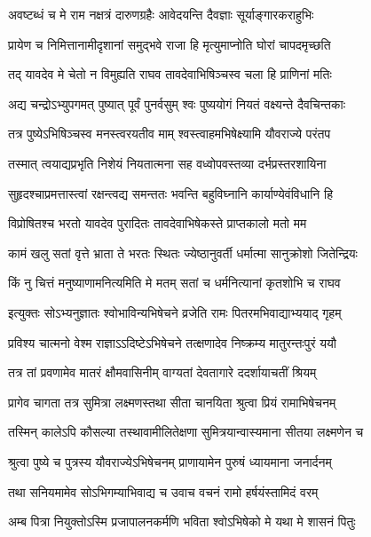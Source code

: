 \twolineshloka
{अवष्टब्धं च मे राम नक्षत्रं दारुणग्रहैः}
{आवेदयन्ति दैवज्ञाः सूर्याङ्गारकराहुभिः} %

\twolineshloka
{प्रायेण च निमित्तानामीदृशानां समुद्भवे}
{राजा हि मृत्युमाप्नोति घोरां चापदमृच्छति} %

\twolineshloka
{तद् यावदेव मे चेतो न विमुह्यति राघव}
{तावदेवाभिषिञ्चस्व चला हि प्राणिनां मतिः} %

\twolineshloka
{अद्य चन्द्रोऽभ्युपगमत् पुष्यात् पूर्वं पुनर्वसुम्}
{श्वः पुष्ययोगं नियतं वक्ष्यन्ते दैवचिन्तकाः} %

\twolineshloka
{तत्र पुष्येऽभिषिञ्चस्व मनस्त्वरयतीव माम्}
{श्वस्त्वाहमभिषेक्ष्यामि यौवराज्ये परंतप} %

\twolineshloka
{तस्मात् त्वयाद्यप्रभृति निशेयं नियतात्मना}
{सह वध्वोपवस्तव्या दर्भप्रस्तरशायिना} %

\twolineshloka
{सुहृदश्चाप्रमत्तास्त्वां रक्षन्त्वद्य समन्ततः}
{भवन्ति बहुविघ्नानि कार्याण्येवंविधानि हि} %

\twolineshloka
{विप्रोषितश्च भरतो यावदेव पुरादितः}
{तावदेवाभिषेकस्ते प्राप्तकालो मतो मम} %

\twolineshloka
{कामं खलु सतां वृत्ते भ्राता ते भरतः स्थितः}
{ज्येष्ठानुवर्ती धर्मात्मा सानुक्रोशो जितेन्द्रियः} %

\twolineshloka
{किं नु चित्तं मनुष्याणामनित्यमिति मे मतम्}
{सतां च धर्मनित्यानां कृतशोभि च राघव} %

\twolineshloka
{इत्युक्तः सोऽभ्यनुज्ञातः श्वोभाविन्यभिषेचने}
{व्रजेति रामः पितरमभिवाद्याभ्ययाद् गृहम्} %

\twolineshloka
{प्रविश्य चात्मनो वेश्म राज्ञाऽऽदिष्टेऽभिषेचने}
{तत्क्षणादेव निष्क्रम्य मातुरन्तःपुरं ययौ} %

\twolineshloka
{तत्र तां प्रवणामेव मातरं क्षौमवासिनीम्}
{वाग्यतां देवतागारे ददर्शायाचतीं श्रियम्} %

\twolineshloka
{प्रागेव चागता तत्र सुमित्रा लक्ष्मणस्तथा}
{सीता चानयिता श्रुत्वा प्रियं रामाभिषेचनम्} %

\twolineshloka
{तस्मिन् कालेऽपि कौसल्या तस्थावामीलितेक्षणा}
{सुमित्रयान्वास्यमाना सीतया लक्ष्मणेन च} %

\twolineshloka
{श्रुत्वा पुष्ये च पुत्रस्य यौवराज्येऽभिषेचनम्}
{प्राणायामेन पुरुषं ध्यायमाना जनार्दनम्} %

\twolineshloka
{तथा सनियमामेव सोऽभिगम्याभिवाद्य च}
{उवाच वचनं रामो हर्षयंस्तामिदं वरम्} %

\twolineshloka
{अम्ब पित्रा नियुक्तोऽस्मि प्रजापालनकर्मणि}
{भविता श्वोऽभिषेको मे यथा मे शासनं पितुः} %

